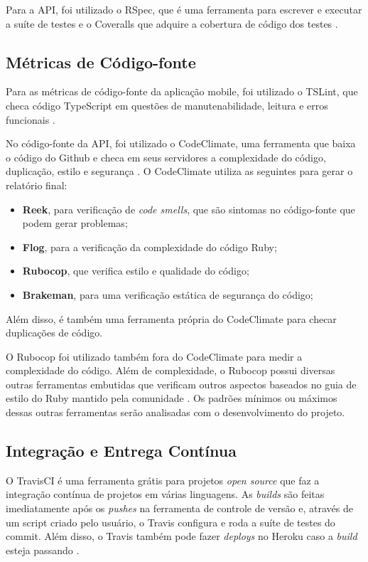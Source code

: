 Para a API, foi utilizado o RSpec, que é uma ferramenta para escrever e executar a suíte de testes \cite{rspec} e o Coveralls que adquire a cobertura de código dos testes \cite{coveralls}.

\subsection{Métricas de Código-fonte}
Para as métricas de código-fonte da aplicação mobile, foi utilizado o TSLint, que checa código TypeScript em questões de manutenabilidade, leitura e erros funcionais \cite{tslint}.

No código-fonte da API, foi utilizado o CodeClimate, uma ferramenta que baixa o código do Github e checa em seus servidores a complexidade do código, duplicação, estilo e segurança \cite{codeclimate}. O CodeClimate utiliza as seguintes para gerar o relatório final:
\begin{itemize}
    \item \textbf{Reek}, para verificação de \textit{code smells}, que são sintomas no código-fonte que podem gerar problemas;
    \item \textbf{Flog}, para a verificação da complexidade do código Ruby;
    \item \textbf{Rubocop}, que verifica estilo e qualidade do código;
    \item \textbf{Brakeman}, para uma verificação estática de segurança do código;
\end{itemize}

Além disso, é também uma ferramenta própria do CodeClimate para checar duplicações de código.

O Rubocop foi utilizado também fora do CodeClimate para medir a complexidade do código. Além de complexidade, o Rubocop possui diversas outras ferramentas embutidas que verificam outros aspectos baseados no guia de estilo do Ruby mantido pela comunidade \cite{rubocop}. Os padrões mínimos ou máximos dessas outras ferramentas serão analisadas com o desenvolvimento do projeto.

\subsection{Integração e Entrega Contínua}

O TravisCI é uma ferramenta grátis para projetos \textit{open source} que faz a integração contínua de projetos em várias linguagens. As \textit{builds} são feitas imediatamente após os \textit{pushes} na ferramenta de controle de versão e, através de um script criado pelo usuário, o Travis configura e roda a suíte de testes do commit. Além disso, o Travis também pode fazer \textit{deploys} no Heroku caso a \textit{build} esteja passando \cite{travis-ci}.

